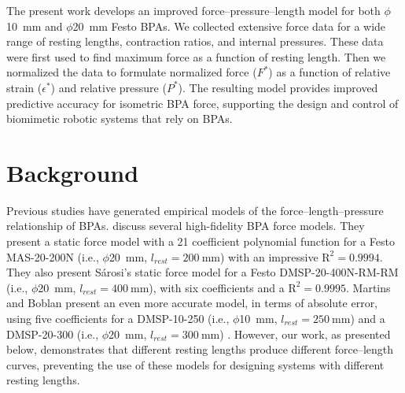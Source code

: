 \documentclass[actuators,article,accept,pdftex,moreauthors]{Definitions/mdpi}
\begin{document}
The present work develops an improved force–pressure–length model for both $\phi$\qty{10}{\mm} and $\phi$\qty{20}{\mm} Festo BPAs. We collected extensive force data for a wide range of resting lengths, contraction ratios, and internal pressures. These data were first used to find maximum force as a function of resting length. Then we normalized the data to formulate normalized force ($F^*$) as a function of relative strain ($\epsilon^*$) and relative pressure ($P^*$). The resulting model provides improved predictive accuracy for isometric BPA force, supporting the design and control of biomimetic robotic systems that rely on BPAs.



\section{Background}

{Previous} %
 studies have generated empirical models of the force--length--pressure relationship of BPAs. \citet{sarosi_comparative_2017} discuss several high-fidelity BPA force models. They present a static force model with a 21 coefficient polynomial function for a {Festo MAS-20-200N} %
 (i.e., $\phi$\qty{20}{\mm}, $l_{rest}=\qty{200}{\mm}$) with an impressive $\text{R}^2=0.9994$. They also present Sárosi's static force model for a {Festo DMSP-20-400N-RM-RM} (i.e., {$\phi$\qty{20}{\mm},} %
 $l_{rest}=\qty{400}{\mm}$), with six coefficients and a $\text{R}^2=0.9995$. Martins and Boblan present an even more accurate model, in terms of absolute error, using five coefficients for a {DMSP-10-250} (i.e., $\phi$\qty{10}{\mm}, $l_{rest}=\qty{250}{\mm}$) and a {DMSP-20-300} (i.e., $\phi$\qty{20}{\mm}, $l_{rest}=\qty{300}{\mm}$) \citep{martens_modeling_2017}.  However, our work, as presented below, demonstrates that different resting lengths produce different force--length curves, preventing the use of these models for designing systems with different resting lengths.
\end{document}
